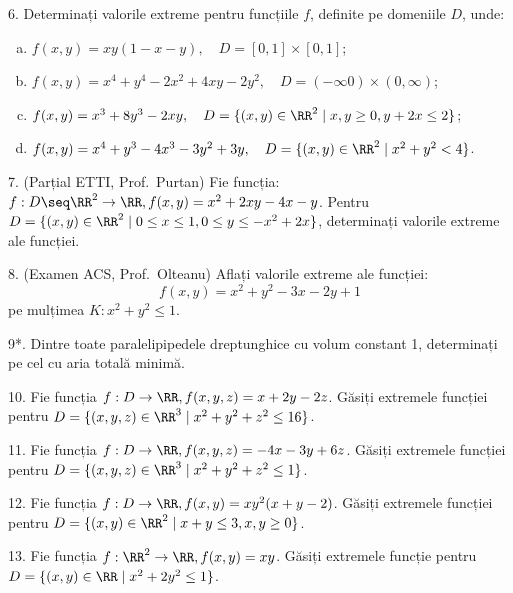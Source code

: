 \vspace{0.5cm}

6. Determinați valorile extreme pentru funcțiile $ f $, definite pe
domeniile $ D $, unde:
\begin{enumerate}[(a)]
    \item $ f(x, y) = xy(1 - x - y), \quad D = [0, 1] \times [0, 1] $;
    \item $ f(x, y) = x^4 + y^4 - 2x^2 + 4xy - 2y^2, \quad D = (-\infty 0) \times (0, \infty) $;
    \item $ f(x, y) = x^3 + 8y^3 - 2xy, \quad D = \{ (x, y) \in \RR^2 \mid x, y \geq 0, y + 2x \leq 2 \} $;
    \item $ f(x, y) = x^4 + y^3 - 4x^3 - 3y^2 + 3y, \quad D = \{ (x, y) \in \RR^2 \mid x^2 + y^2 < 4 \} $.
\end{enumerate}

\vspace{0.5cm}

7. (Parțial ETTI, Prof.\ Purtan) Fie funcția: $ f : D \seq \RR^2 \to \RR, f(x, y) = x^2 + 2xy - 4x - y $.
Pentru $ D = \{ (x, y) \in \RR^2 \mid 0 \leq x \leq 1, 0 \leq y \leq -x^2 + 2x \} $,
determinați valorile extreme ale funcției.

\vspace{0.5cm}

8. (Examen ACS, Prof.\ Olteanu) Aflați valorile extreme ale funcției:
\[
    f(x, y) = x^2 + y^2 - 3x - 2y + 1
\]
pe mulțimea $ K : x^2 + y^2 \leq 1 $.

\vspace{0.5cm}

9*. Dintre toate paralelipipedele dreptunghice cu volum constant 1, determinați
pe cel cu aria totală minimă.

\vspace{0.5cm}

10. Fie funcția $ f : D \to \RR, f(x, y, z) = x + 2y - 2z $.
Găsiți extremele funcției pentru $ D = \{ (x, y, z) \in \RR^3 \mid x^2 + y^2 + z^2 \leq 16 \} $.

\vspace{0.5cm}

11. Fie funcția $ f : D \to \RR, f(x, y, z) = -4x - 3y + 6z $.
Găsiți extremele funcției pentru $ D = \{ (x, y, z) \in \RR^3 \mid x^2 + y^2 + z^2 \leq 1 \} $.

\vspace{0.5cm}

12. Fie funcția $ f : D \to \RR, f(x, y) = xy^2(x + y - 2) $. Găsiți extremele funcției
pentru $ D = \{ (x, y) \in \RR^2 \mid x + y \leq 3, x, y \geq 0 \} $.

\vspace{0.5cm}

13. Fie funcția $ f : \RR^2 \to \RR, f(x, y) = xy $. Găsiți extremele funcție pentru
$ D = \{ (x, y) \in \RR \mid x^2 + 2y^2 \leq 1 \} $.


